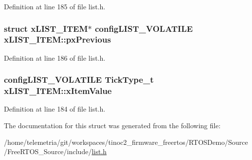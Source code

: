 Definition at line 185 of file list.\+h.

\subsubsection[{\texorpdfstring{px\+Previous}{pxPrevious}}]{\setlength{\rightskip}{0pt plus 5cm}struct {\bf x\+L\+I\+S\+T\+\_\+\+I\+T\+EM}$\ast$ {\bf config\+L\+I\+S\+T\+\_\+\+V\+O\+L\+A\+T\+I\+LE} x\+L\+I\+S\+T\+\_\+\+I\+T\+E\+M\+::px\+Previous}\hypertarget{structx_l_i_s_t___i_t_e_m_ae8e553eae41010a8e41c66d76c94110b}{}\label{structx_l_i_s_t___i_t_e_m_ae8e553eae41010a8e41c66d76c94110b}


Definition at line 186 of file list.\+h.

\subsubsection[{\texorpdfstring{x\+Item\+Value}{xItemValue}}]{ {\bf config\+L\+I\+S\+T\+\_\+\+V\+O\+L\+A\+T\+I\+LE} {\bf Tick\+Type\+\_\+t} x\+L\+I\+S\+T\+\_\+\+I\+T\+E\+M\+::x\+Item\+Value}\hypertarget{structx_l_i_s_t___i_t_e_m_a9b1f26de79f9da1403ca3ebc7a2e653a}{}\label{structx_l_i_s_t___i_t_e_m_a9b1f26de79f9da1403ca3ebc7a2e653a}


Definition at line 184 of file list.\+h.



The documentation for this struct was generated from the following file\+:\begin{DoxyCompactItemize}
\item 
/home/telemetria/git/workspaces/tinoc2\+\_\+firmware\+\_\+freertos/\+R\+T\+O\+S\+Demo/\+Source/\+Free\+R\+T\+O\+S\+\_\+\+Source/include/\hyperlink{list_8h}{list.\+h}\end{DoxyCompactItemize}
